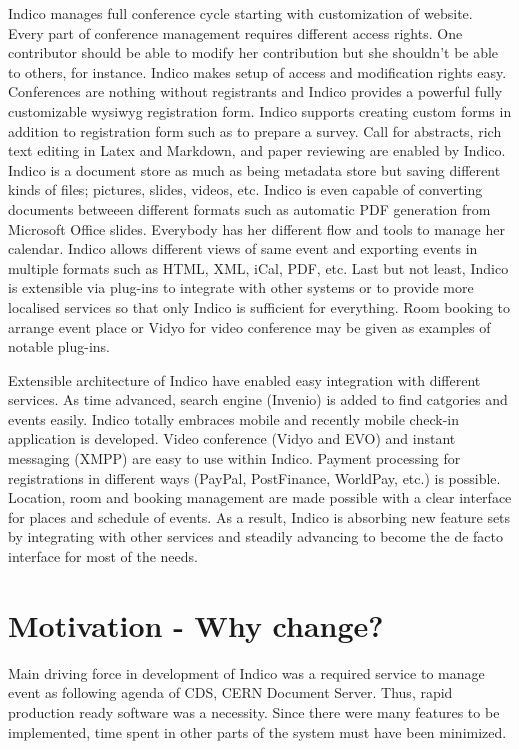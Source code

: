 \par Indico manages full conference cycle starting with customization of website. Every part of conference management requires different access rights. One contributor should be able to modify her contribution but she shouldn't be able to others, for instance. Indico makes setup of access and modification rights easy. Conferences are nothing without registrants and Indico provides a powerful fully customizable wysiwyg registration form. Indico supports creating custom forms in addition to registration form such as to prepare a survey. Call for abstracts, rich text editing in Latex and Markdown, and paper reviewing are enabled by Indico. Indico is a document store as much as being metadata store but saving different kinds of files; pictures, slides, videos, etc. Indico is even capable of converting documents betweeen different formats such as automatic PDF generation from Microsoft Office slides. Everybody has her different flow and tools to manage her calendar. Indico allows different views of same event and exporting events in multiple formats such as HTML, XML, iCal, PDF, etc. Last but not least, Indico is extensible via plug-ins to integrate with other systems or to provide more localised services so that only Indico is sufficient for everything. Room booking to arrange event place or Vidyo for video conference may be given as examples of notable plug-ins.

\par Extensible architecture of Indico have enabled easy integration with different services. As time advanced, search engine (Invenio) is added to find catgories and events easily. Indico totally embraces mobile and recently mobile check-in application is developed. Video conference (Vidyo and EVO) and instant messaging (XMPP) are easy to use within Indico. Payment processing for registrations in different ways (PayPal, PostFinance, WorldPay, etc.) is possible. Location, room and booking management are made possible with a clear interface for places and schedule of events. As a result, Indico is absorbing new feature sets by integrating with other services and steadily advancing to become the de facto interface for most of the needs.

\section{Motivation - Why change?}

\par Main driving force in development of Indico was a required service to manage event as following agenda of CDS, CERN Document Server. Thus, rapid production ready software was a necessity. Since there were many features to be implemented, time spent in other parts of the system must have been minimized.

